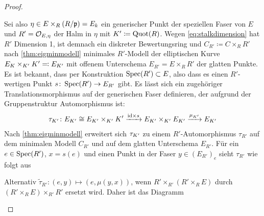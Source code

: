 \begin{Lemma}
\begin{proof}
\begin{description}
      Sei also $\eta\in E\times_R (R/\mathfrak{p})=E_k$ ein generischer Punkt der
      speziellen Faser von $E$ und ${R'=\mathcal{O}_{E,\eta}}$ der Halm in
      $\eta$ mit $K'\coloneqq\operatorname{Quot}(R)$.
      Wegen \autoref{eq:stalkdimension} hat $R'$
      Dimension 1, ist demnach ein diskreter Bewertungsring und
      $C_{R'}\coloneqq C\times_R R'$ nach \ref{thm:eigminmodell}
      minimales $R'$-Modell der elliptischen Kurve
      $E_{K}\times_{K'}K'\eqqcolon E_{K'}$ mit offenem Unterschema
      ${E_{R'}=E\times_R R'}$ der glatten Punkte.
      Es ist bekannt, dass per Konstruktion $\operatorname{Spec}(R')\subset E$, also dass
      es einen $R'$-wertigen Punkt $s\colon\operatorname{Spec}(R')\to E_{R'}$ gibt.
      Es lässt sich ein zugehöriger Translationsmorphismus auf der
      generischen Faser definieren, der aufgrund der Gruppenstruktur
      Automorphismus ist:
      \begin{gather*}
        \tau_{K'}\colon
        E_{K'}\cong E_{K'}\times_{K'}K'
        \xrightarrow{\mathrm{id}\times s}
        E_{K'}\times_{K'}E_{K'}
        \xrightarrow{\mu_{K'}}
        E_{K'}
      \end{gather*}
      Nach \ref{thm:eigminmodell} erweitert sich $\tau_{K'}$ zu
      einem $R'$-Automorphismus $\tau_{R'}$ auf dem minimalen Modell
      $C_{R'}$ und auf dem glatten Unterschema $E_{R'}$.
      Für ein $e\in\operatorname{Spec}(R')$, $x=s(e)$ und einen Punkt in der Faser
      $y\in(E_{R'})_e$ sieht $\tau_{R'}$ wie folgt aus
      \begin{center}
      \end{center}
      Alternativ $\tilde\tau_{R'}\colon(e,y)\mapsto(e,\mu(y,x))$, wenn
      $R'\times_{R'}(R'\times_R E)$ durch $(R'\times_R E)\times_{R'}R'$
      ersetzt wird.
      Daher ist das Diagramm
      \begin{center}
\end{center}
\end{description}
\end{proof}
\end{Lemma}
